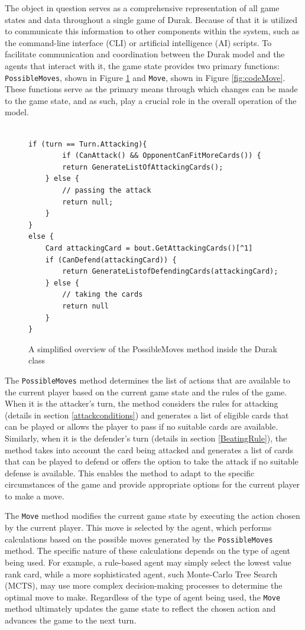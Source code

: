 The object in question serves as a comprehensive representation of all game states and data throughout a single game of Durak. Because of that it is utilized to communicate this information to other components within the system, such as the command-line interface (CLI) or artificial intelligence (AI) scripts. To facilitate communication and coordination between the Durak model and the agents that interact with it, the game state provides two primary functions: \texttt{PossibleMoves}, shown in Figure \ref{fig:codePossibleMoves} and \texttt{Move}, shown in Figure \ref{fig:codeMove}. These functions serve as the primary means through which changes can be made to the game state, and as such, play a crucial role in the overall operation of the model. 

\begin{figure}[h]
\captionsetup{justification=centering}
\begin{lstlisting}

if (turn == Turn.Attacking){
    	if (CanAttack() && OpponentCanFitMoreCards()) {
		return GenerateListOfAttackingCards();
	} else {
		// passing the attack
		return null;	
	}
}
else {
	Card attackingCard = bout.GetAttackingCards()[^1]
	if (CanDefend(attackingCard)) {
		return GenerateListofDefendingCards(attackingCard);
	} else {
		// taking the cards
		return null
	}
}
\end{lstlisting}
\caption{A simplified overview of the PossibleMoves method inside the Durak class}
\label{fig:codePossibleMoves}
\end{figure}

The \texttt{PossibleMoves} method determines the list of actions that are available to the current player based on the current game state and the rules of the game. When it is the attacker's turn, the method considers the rules for attacking (details in section \ref{attackconditions}) and generates a list of eligible cards that can be played or allows the player to pass if no suitable cards are available. Similarly, when it is the defender's turn (details in section \ref{BeatingRule}), the method takes into account the card being attacked and generates a list of cards that can be played to defend or offers the option to take the attack if no suitable defense is available. This enables the method to adapt to the specific circumstances of the game and provide appropriate options for the current player to make a move.

The \texttt{Move} method modifies the current game state by executing the action chosen by the current player. This move is selected by the agent, which performs calculations based on the possible moves generated by the \texttt{PossibleMoves} method. The specific nature of these calculations depends on the type of agent being used. For example, a rule-based agent may simply select the lowest value rank card, while a more sophisticated agent, such Monte-Carlo Tree Search (MCTS), may use more complex decision-making processes to determine the optimal move to make. Regardless of the type of agent being used, the \texttt{Move} method ultimately updates the game state to reflect the chosen action and advances the game to the next turn.

